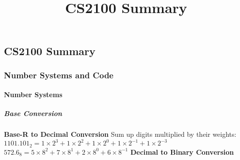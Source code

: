 \documentclass[10pt, twocolumn]{article}
\title{CS2100 Summary}
\begin{document}
\begin{center}
\part*{CS2100 Summary}
\end{center}
\tableofcontents
\newpage
\onehalfspacing

\section{Number Systems and Code}
\subsection{Number Systems}
\subsubsection{Base Conversion}
{\bf Base-R to Decimal Conversion}
\newline
Sum up digits multiplied by their weights:
\newline
$1101.101_2 = 1\times 2^3 + 1\times 2^2 + 1\times 2^0 + 1\times 2^{-1} + 1\times 2^{-3}$ \\
$572.6_8 = 5\times 8^2 + 7\times 8^1 + 2\times 8^0 + 6\times 8^{-1}$
\newline
{\bf Decimal to Binary Conversion}
\end{document}
